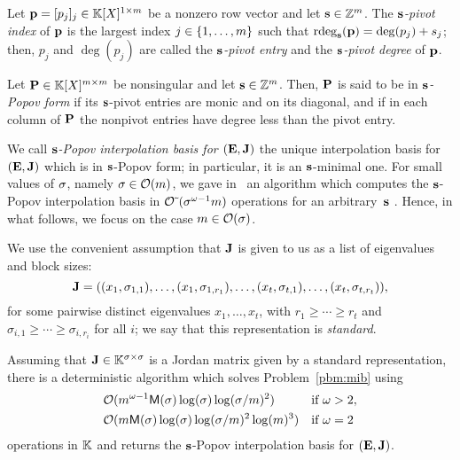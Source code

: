\documentclass[preprint]{sig-alternate-05-2015}
\begin{document}
\begin{dfn}
\label{dfn:pivot}
Let $\row{p} = [p_j]_j \in \polMatSpace[1][\rdim]$ be a nonzero row vector and
let $\mathbf{s} \in \mathbb{Z}^{m}$. The \emph{$\mathbf{s}$-pivot index} of $\row{p}$ is
the largest index $j \in \{1,\ldots,m\}$ such that $\rdeg[\shifts]{\row{p}}
= \deg(p_j) + \shift{j}$; then, $p_j$ and $\deg(p_j)$ are called the
\emph{$\mathbf{s}$-pivot entry} and the \emph{$\mathbf{s}$-pivot degree} of
$\row{p}$.
\end{dfn}

\begin{dfn}
\label{dfn:popov}
Let $\mat{P} \in \polMatSpace[\rdim]$ be nonsingular and let $\mathbf{s} \in
\mathbb{Z}^{m}$. Then, $\mat{P}$ is said to be in \emph{$\mathbf{s}$-Popov form} if
its $\mathbf{s}$-pivot entries are monic and on its diagonal, and if in each
column of $\mat{P}$ the nonpivot entries have degree less than the pivot entry.
\end{dfn}

We call \emph{$\mathbf{s}$-Popov interpolation basis for $(\evMat,\mulmat)$} the
unique interpolation basis for $(\evMat,\mulmat)$ which is in $\mathbf{s}$-Popov
form; in particular, it is an $\mathbf{s}$-minimal one. For small values of
$\sigma$, namely $\sigma \in \mathcal{O}(m)$, we gave
in~\cite[Section~7]{JeNeScVi15} an algorithm which computes the $\mathbf{s}$-Popov
interpolation basis in $\mathcal{O}\tilde{~}(\sigma^{\omega-1} m)$ operations for an
arbitrary~$\mathbf{s}$ \cite[Theorem~1.4]{JeNeScVi15}. Hence, in what follows, we
focus on the case $m \in \mathcal{O}(\sigma)$.

We use the convenient assumption that $\mulmat$ is given to us as a
list of eigenvalues and block sizes:
\begin{equation*}
\mulmat=((x_1,\sigma_{1,1}),\dots,(x_1,\sigma_{1,r_1}),\dots,(x_t,\sigma_{t,1}),\dots,(x_t,\sigma_{t,r_t})),  
\end{equation*}
for some pairwise distinct eigenvalues $x_1,\dots,x_t$, with $r_1 \ge \cdots
\ge r_t$ and $\sigma_{i,1} \ge \cdots \ge \sigma_{i,r_i}$ for all $i$; we say
that this representation is \emph{standard}.

\begin{thm}
  \label{thm:pib}
  Assuming that $\mulmat\in\matSpace[\order]$ is a Jordan matrix given by a
  standard representation, there is a deterministic algorithm which solves
  Problem~\ref{pbm:mib} using
  \begin{align*}
  \mathcal{O}( & m^{\omega-1} \mathsf{M}(\sigma)
  \log(\sigma) \log(\sigma/m)^2 ) & \text{if }
  \omega>2, \\
  \mathcal{O}( & m \mathsf{M}(\sigma) \log(\sigma)
  \log(\sigma/m)^2 \log(m)^3 
  ) & \text{if } \omega=2\;
  \end{align*}
  operations in $\mathbb{K}$ and returns the $\mathbf{s}$-Popov interpolation basis
  for $(\evMat,\mulmat)$.
\end{thm}
\end{document}
